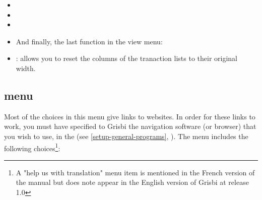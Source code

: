 \begin{itemize}
	\item {}%
	\item {}%
	\item {}%
	\item {}%
	\vspace{2mm}
	\begin{addmargin}[0pt]{-.35cm} 	%
	And finally, the last function in the view menu:%
	\end{addmargin}	
	\item {}: allows you to reset the columns of the tranaction lists to their original width. 
\end{itemize}


\subsection{ menu\label{home-menus-help}}

Most of the choices in this menu give links to websites. In order for these links to work, you must have specified to Grisbi the navigation software (or browser) that you wish to use, in the  (see \vref{setup-general-programs}, ). The  menu includes the following choices\footnote{ A "help us with translation" menu item is mentioned in the French version of the manual but does note appear in the English version of Grisbi at release 1.0}:

